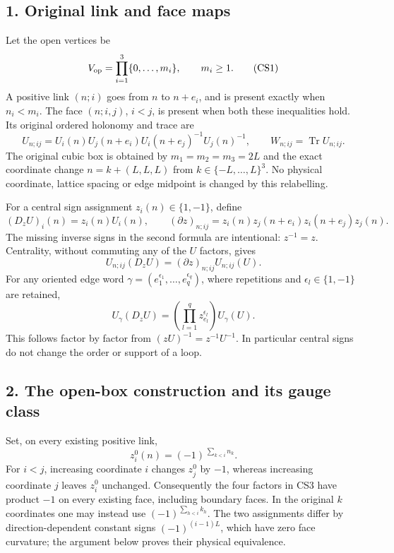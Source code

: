 \documentclass[11pt]{article}
\begin{document}
\subsection*{1. Original link and face maps}

Let the open vertices be
\[
 V_{\rm op}=\prod_{i=1}^3\{0,\ldots,m_i\},\qquad m_i\ge1.
 \tag{CS1}
\]
A positive link \((n;i)\) goes from \(n\) to \(n+e_i\), and is present exactly when \(n_i<m_i\). The face \((n;i,j)\), \(i<j\), is present when both these inequalities hold. Its original ordered holonomy and trace are
\[
 U_{n;ij}=U_i(n)U_j(n+e_i)U_i(n+e_j)^{-1}U_j(n)^{-1},
 \qquad W_{n;ij}=\operatorname{Tr}U_{n;ij}.
 \tag{CS2}
\]
The original cubic box is obtained by \(m_1=m_2=m_3=2L\) and the exact coordinate change \(n=k+(L,L,L)\) from \(k\in\{-L,\ldots,L\}^3\). No physical coordinate, lattice spacing or edge midpoint is changed by this relabelling.

For a central sign assignment \(z_i(n)\in\{1,-1\}\), define
\[
 (D_zU)_i(n)=z_i(n)U_i(n),\qquad
 (\partial z)_{n;ij}
 =z_i(n)z_j(n+e_i)z_i(n+e_j)z_j(n).
 \tag{CS3}
\]
The missing inverse signs in the second formula are intentional: \(z^{-1}=z\). Centrality, without commuting any of the \(U\) factors, gives
\[
 U_{n;ij}(D_zU)=(\partial z)_{n;ij}U_{n;ij}(U).
 \tag{CS4}
\]
For any oriented edge word \(\gamma=(e_1^{\epsilon_1},\ldots,e_q^{\epsilon_q})\), where repetitions and \(\epsilon_l\in\{1,-1\}\) are retained,
\[
 U_\gamma(D_zU)=
       \left(\prod_{l=1}^q z_{e_l}^{\epsilon_l}\right)U_\gamma(U).
 \tag{CS5}
\]
This follows factor by factor from \((zU)^{-1}=z^{-1}U^{-1}\). In particular central signs do not change the order or support of a loop.

\subsection*{2. The open-box construction and its gauge class}

Set, on every existing positive link,
\[
 z_i^0(n)=(-1)^{\,\sum_{k<i}n_k}.
 \tag{CS6}
\]
For \(i<j\), increasing coordinate \(i\) changes \(z_j^0\) by \(-1\), whereas increasing coordinate \(j\) leaves \(z_i^0\) unchanged. Consequently the four factors in CS3 have product \(-1\) on every existing face, including boundary faces. In the original \(k\) coordinates one may instead use \((-1)^{\sum_{h<i}k_h}\). The two assignments differ by direction-dependent constant signs \((-1)^{(i-1)L}\), which have zero face curvature; the argument below proves their physical equivalence.
\end{document}
